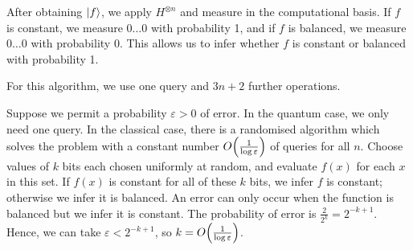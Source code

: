 After obtaining \( \ket{f} \), we apply \( H^{\otimes n} \) and measure in the computational basis.
If \( f \) is constant, we measure \( 0\dots 0 \) with probability 1, and if \( f \) is balanced, we measure \( 0\dots 0 \) with probability 0.
This allows us to infer whether \( f \) is constant or balanced with probability 1.
\begin{center}
    \leavevmode
\end{center}
For this algorithm, we use one query and \( 3n+2 \) further operations.

Suppose we permit a probability \( \varepsilon > 0 \) of error.
In the quantum case, we only need one query.
In the classical case, there is a randomised algorithm which solves the problem with a constant number \( O\qty(\frac{1}{\log \varepsilon}) \) of queries for all \( n \).
Choose values of \( k \) bits each chosen uniformly at random, and evaluate \( f(x) \) for each \( x \) in this set.
If \( f(x) \) is constant for all of these \( k \) bits, we infer \( f \) is constant; otherwise we infer it is balanced.
An error can only occur when the function is balanced but we infer it is constant.
The probability of error is \( \frac{2}{2^k} = 2^{-k+1} \).
Hence, we can take \( \varepsilon < 2^{-k+1} \), so \( k = O\qty(\frac{1}{\log \varepsilon}) \).

